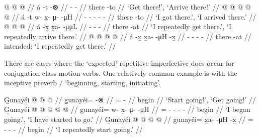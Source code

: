\documentclass[12pt,letterpaper,oneside,article]{memoir}
\begin{document}
\pex\label{ex:motpos-motrep-telic}%
\a\label{ex:motpos-motrep-telic-imp}%
%
\begingl
	\gla	{} @ {}  @ {} @ {} //
	\glb	á -t {}  -⊗ //
	\glc	{} - \·  - //
	\gld	there -to  {} {} //
	\glft	‘Get there!’, ‘Arrive there!’
		//
\endgl
\a\label{ex:motpos-motrep-telic-pfv}%
%
\begingl
	\gla	{} @ {}  @ {} @ {} @ {} @ {} //
	\glb	á -t w- x̱- μ-  -μH //
	\glc	{} - - - -  - //
	\gld	there -to  {} {} {} {} //
	\glft	‘I got there.’, ‘I arrived there.’
		//
\endgl
\a\label{ex:motpos-motrep-telic-repch}%
%
\begingl
	\gla	{} @ {}  @ {} @ {} //
	\glb	á -x̱ x̱a-  -μμL //
	\glc	{} - -  - //
	\gld	there -at  {} {} //
	\glft	‘I repeatedly get there.’, ‘I repeatedly arrive there.’
		//
\endgl
\a\label{ex:motpos-motrep-telic-repxh}%
\ljudge{*}%
%
\begingl
	\gla	{} @ {}  @ {} @ {} @ {} //
	\glb	á -x̱ x̱a-  -μH -x̱ //
	\glc	{} - -  - - //
	\gld	there -at  {} {} {} //
	\glft	intended: ‘I repeatedly get there.’
		//
\endgl
\xe

There are cases where the ‘expected’  repetitive imperfective does occur for  conjugation class motion verbs.
One relatively common example is with the inceptive preverb  /  ‘beginning, starting, initiating’.

\pex\label{ex:motpos-motrep-incep}%
\a\label{ex:motpos-motrep-incep-imp}%
%
\begingl
	\gla	G̱unayéi @  @ {} @ {} //
	\glb	g̱unayéi= {}  -⊗ //
	\glc	{}= \·  - //
	\gld	begin\•  {} {} //
	\glft	‘Start going!’, ‘Get going!’
		//
\endgl
\a\label{ex:motpos-motrep-incep-pfv}%
%
\begingl
	\gla	G̱unayéi @  @ {} @ {} @ {} @ {} //
	\glb	g̱unayéi= w- x̱- μ-  -μH //
	\glc	{}= - - -  - //
	\gld	begin\•  {} {} {} {} //
	\glft	‘I began going.’, ‘I have started to go.’
		//
\endgl
\a\label{ex:motpos-motrep-incep-repxh}%
%
\begingl
	\gla	G̱unayéi @  @ {} @ {} @ {} //
	\glb	g̱unayéi= x̱a-  -μH -x̱ //
	\glc	{}= -  - - //
	\gld	begin\•  {} {} {} //
	\glft	‘I repeatedly start going.’
		//
\endgl
\xe
\end{document}
